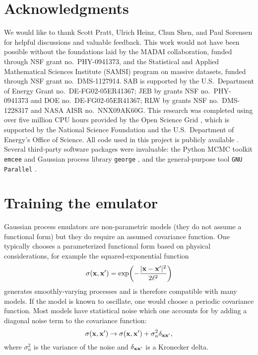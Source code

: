 \documentclass[aps,prc,reprint,superscriptaddress,amsmath]{revtex4-1}
\begin{document}
\section*{Acknowledgments}

We would like to thank Scott Pratt, Ulrich Heinz, Chun Shen, and Paul Sorensen for helpful discussions and valuable feedback.
This work would not have been possible without the foundations laid by the MADAI collaboration, funded through NSF grant no.~PHY-0941373, and the Statistical and Applied Mathematical Sciences Institute (SAMSI) program on massive datasets, funded through NSF grant no.~DMS-1127914.
SAB is supported by the U.S.\ Department of Energy Grant no.~DE-FG02-05ER41367;
JEB by grants NSF no.~PHY-0941373 and DOE no.~DE-FG02-05ER41367;
RLW by grants NSF no.~DMS-1228317 and NASA AISR no.~NNX09AK60G.
This research was completed using over five million CPU hours provided by the Open Science Grid \cite{Pordes:2007zzb,Sfiligoi:2010zz}, which is supported by the National Science Foundation and the U.S.\ Department of Energy's Office of Science.
All code used in this project is publicly available \cite{Bernhard:2015mtd}.
Several third-party software packages were invaluable:
the Python MCMC toolkit \texttt{emcee} \cite{FM:2013mc} and Gaussian process library \texttt{george} \cite{Ambikasaran:2014gp}, and the general-purpose tool \texttt{GNU Parallel} \cite{Tange:2011pa}.


\appendix


\section{\label{app:train}Training the emulator}

\newcommand{\vectheta}{\boldsymbol\theta}

Gaussian process emulators are non-parametric models (they do not assume a functional form) but they do require an assumed covariance function.
One typically chooses a parameterized functional form based on physical considerations, for example the squared-exponential function
\begin{equation*}
  \sigma(\mathbf x, \mathbf x') = \exp\biggl( -\frac{|\mathbf x - \mathbf x'|^2}{2\ell^2} \biggr)
\end{equation*}
generates smoothly-varying processes and is therefore compatible with many models.
If the model is known to oscillate, one would choose a periodic covariance function.
Most models have statistical noise which one accounts for by adding a diagonal noise term to the covariance function:
\begin{equation*}
  \sigma(\mathbf x, \mathbf x') \rightarrow \sigma(\mathbf x, \mathbf x') + \sigma_n^2\delta_{\mathbf x\mathbf x'},
\end{equation*}
where $\sigma_n^2$ is the variance of the noise and $\delta_{\mathbf x\mathbf x'}$ is a Kronecker delta.
\end{document}
